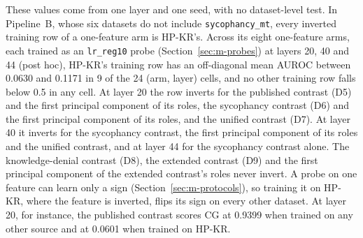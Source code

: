 These values come from one layer and one seed, with no dataset-level test. %
In Pipeline~B, whose six datasets do not include \texttt{sycophancy\_mt}, every inverted training row of a one-feature arm is HP-KR's. %
Across its eight one-feature arms, each trained as an \texttt{lr\_reg10} probe (Section~\ref{sec:m-probes}) at layers 20, 40 and 44 (post hoc), HP-KR's training row has an off-diagonal mean AUROC between 0.0630 and 0.1171 in 9 of the 24 (arm, layer) cells, and no other training row falls below 0.5 in any cell. %
At layer 20 the row inverts for the published contrast (D5) and the first principal component of its roles, the sycophancy contrast (D6) and the first principal component of its roles, and the unified contrast (D7). %
At layer 40 it inverts for the sycophancy contrast, the first principal component of its roles and the unified contrast, and at layer 44 for the sycophancy contrast alone. %
The knowledge-denial contrast (D8), the extended contrast (D9) and the first principal component of the extended contrast's roles never invert. %
A probe on one feature can learn only a sign (Section~\ref{sec:m-protocols}), so training it on HP-KR, where the feature is inverted, flips its sign on every other dataset.
At layer 20, for instance, the published contrast scores CG at 0.9399 when trained on any other source and at 0.0601 when trained on HP-KR. %

